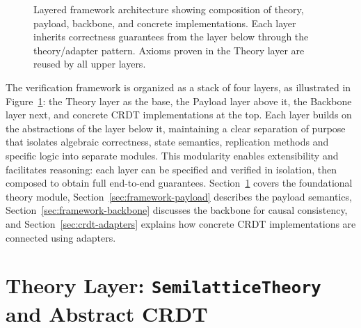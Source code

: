 \begin{figure}[b!]
  \caption{Layered framework architecture showing composition of theory, payload, backbone, and concrete implementations. Each layer inherits correctness guarantees from the layer below through the theory/adapter pattern. Axioms proven in the Theory layer are reused by all upper layers.}
  \label{fig:layered-architecture}
\end{figure}

The verification framework is organized as a stack of four layers, as illustrated in Figure~\ref{fig:layered-architecture}: the Theory layer as the base, the Payload layer above it, the Backbone layer next, and concrete CRDT implementations at the top. Each layer builds on the abstractions of the layer below it, maintaining a clear separation of purpose that isolates algebraic correctness, state semantics, replication methods and specific logic into separate modules. This modularity enables extensibility and facilitates reasoning: each layer can be specified and verified in isolation, then composed to obtain full end-to-end guarantees. Section~\ref{sec:theory-layer} covers the foundational theory module, Section~\ref{sec:framework-payload} describes the payload semantics, Section~\ref{sec:framework-backbone} discusses the backbone for causal consistency, and Section~\ref{sec:crdt-adapters} explains how concrete CRDT implementations are connected using adapters.



\section{Theory Layer: \texttt{SemilatticeTheory} and Abstract CRDT}
\label{sec:theory-layer}


